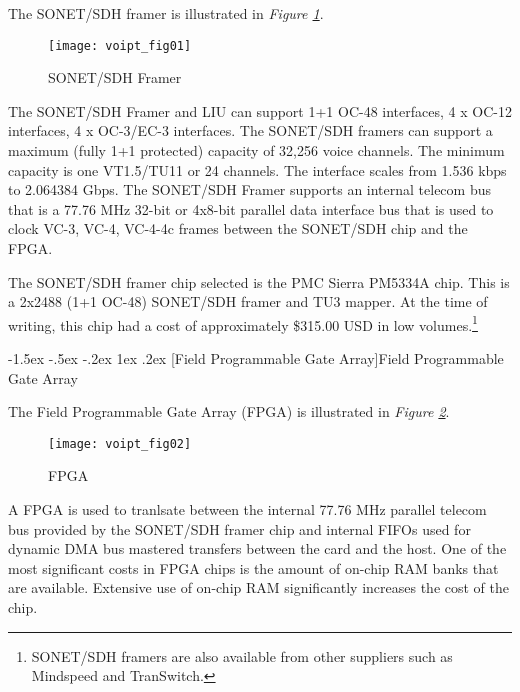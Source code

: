 \documentclass[letterpaper,final,notitlepage,twocolumn,10pt,twoside]{article}
\makeatletter
\let\normalsize = \small
\let\small = \footnotesize
\let\footnotesize = \scriptsize
\let\scriptsize = \tiny
\renewcommand\subsection{\@startsection{subsection}{2}{\z@}%
                                     {-1.5ex \@plus -.5ex \@minus -.2ex}%
                                     {1ex \@plus .2ex}%
                                     {\normalfont\normalsize\bfseries}}
\makeatother
\begin{document}
The SONET/SDH framer is illustrated in \textsl{Figure \ref{figure:voipt_fig01}}.
\begin{figure}[htp]
\center\texttt{[image: voipt\_fig01]}
\caption[SONET/SDH Framer]{SONET/SDH Framer}
\label{figure:voipt_fig01}
\end{figure}
The SONET/SDH Framer and LIU can support 1+1 OC-48 interfaces, 4 x OC-12
interfaces, 4 x OC-3/EC-3 interfaces.  The SONET/SDH framers can support a
maximum (fully 1+1 protected) capacity of 32,256 voice channels.  The minimum
capacity is one VT1.5/TU11 or 24 channels.  The interface scales from 1.536 kbps
to 2.064384 Gbps.  The SONET/SDH Framer supports an internal telecom bus that is a
77.76 MHz 32-bit or 4x8-bit parallel data interface bus that is used to clock
VC-3, VC-4, VC-4-4c frames between the SONET/SDH chip and the FPGA.

The SONET/SDH framer chip selected is the PMC Sierra PM5334A chip.  This is a
2x2488 (1+1 OC-48) SONET/SDH framer and TU3 mapper.  At the time of writing,
this chip had a cost of approximately \$315.00 USD in low
volumes.\footnote{
SONET/SDH framers are also available from other suppliers such as Mindspeed and
TranSwitch.}

\subsection[Field Programmable Gate Array]{Field Programmable Gate Array}

The Field Programmable Gate Array (FPGA) is illustrated in \textsl{Figure
\ref{figure:voipt_fig02}}.
\begin{figure}[htp]
\center\texttt{[image: voipt\_fig02]}
\caption[FPGA]{FPGA}
\label{figure:voipt_fig02}
\end{figure}
A FPGA is used to tranlsate between the internal 77.76 MHz parallel telecom bus
provided by the SONET/SDH framer chip and internal FIFOs used for dynamic DMA
bus mastered transfers between the card and the host.  One of the most
significant costs in FPGA chips is the amount of on-chip RAM banks that are
available.  Extensive use of on-chip RAM significantly increases the cost of the
chip.
\end{document}
